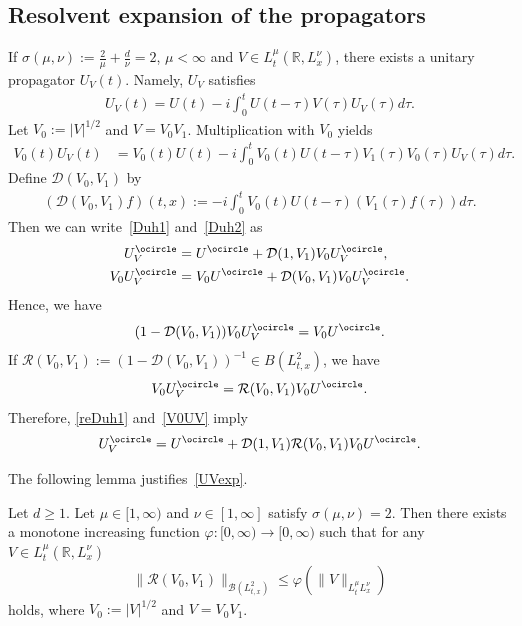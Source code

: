 \documentclass[AHL,Unicode,longabstracts,MathTools,published]{cedram}
\newcommand{\CB}{\mathcal{B}}
\newcommand{\CD}{\mathcal{D}}
\newcommand{\CR}{\mathcal{R}}
\newcommand{\ph}{\varphi}
\newcommand{\ta}{\tau}
\newcommand{\si}{\sigma}
\newcommand{\I}{\infty}
\newcommand{\tx}{{t,x}}
\newcommand{\R}{\mathbb{R}}
\newcommand{\oc}{\ocircle}
\begin{document}
\subsection{Resolvent expansion of the propagators} If $\si(\mu,\nu):= \frac{2}{\mu}+\frac{d}{\nu}=2$, $\mu < \I$ and $V \in L^\mu_t(\R, L^\nu_x)$, there exists a unitary propagator $U_V(t)$. Namely, $U_V$ satisfies
\begin{align}\label{Duh1}
U_V(t) = U(t) - i \int_0^t U(t-\ta)V(\ta)U_V(\ta)d\ta.
\end{align}
Let $V_0 := |V|^{1/2}$ and $V = V_0V_1$. Multiplication with $V_0$ yields
\begin{align}\label{Duh2}
V_0(t) U_V(t) &= V_0(t) U(t) - i \int_0^t V_0(t)U(t-\ta)V_1(\ta)V_0(\ta)U_V(\ta)d\ta.
\end{align}
Define $\CD(V_0, V_1)$ by
\begin{align}\label{def of D}
(\CD(V_0, V_1)f)(t,x) := -i\int_0^t V_0(t)U(t-\ta)(V_1(\ta)f(\ta))d\ta.
\end{align}
Then we can write~\eqref{Duh1} and~\eqref{Duh2} as
\begin{align}
U_V^\ocircle &= U^\ocircle + \CD(1, V_1)V_0 U_V^\ocircle, \label{reDuh1}
\\
V_0 U_V^\ocircle &= V_0 U^\ocircle + \CD(V_0, V_1)V_0 U_V^\ocircle \nonumber.
\end{align}
Hence, we have
\begin{align}
(1 - \CD(V_0, V_1))V_0 U_V^\oc = V_0 U^\oc.
\end{align}
If $\CR(V_0, V_1) := (1-\CD(V_0, V_1))^{-1} \in B(L^2_{t,x})$, we have
\begin{align}\label{V0UV}
V_0 U_V^\oc = \CR(V_0, V_1) V_0 U^\oc.
\end{align}
Therefore, \eqref{reDuh1} and~\eqref{V0UV} imply
\begin{align}\label{UVexp}
U_V^\oc = U^\oc + \CD(1, V_1) \CR(V_0, V_1) V_0 U^\oc.
\end{align}

The following lemma justifies~\eqref{UVexp}.

\begin{lemm}\label{Resol est}
Let $d \geq 1$. Let $\mu \in [1,\I)$ and $\nu \in [1,\I]$ satisfy $\si(\mu,\nu)=2$. Then there exists a monotone increasing function $\ph:[0,\I) \to [0,\I)$ such that for any $V \in L^\mu_t (\R,L^\nu_x)$
\begin{align}
\|\CR(V_0, V_1)\|_{\CB\left(L^2_\tx\right)}
\leq \ph\left(\|V\|_{L^\mu_t L^\nu_x}\right)
\end{align}
holds, where $V_0 := |V|^{1/2}$ and $V = V_0 V_1$.
\end{lemm}
\end{document}
